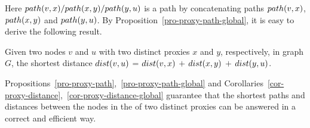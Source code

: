 Here $\path(v, x)/\path(x, y)/\path(y, u)$ is a path by concatenating paths $\path(v,x)$, $\path(x,y)$ and $\path(y,u)$.
By Proposition~\ref{pro-proxy-path-global}, it is easy to derive the following result.

\begin{cor}
\label{cor-proxy-distance-global} Given two nodes $v$ and $u$ with two distinct proxies $x$ and $y$, respectively, in graph $G$, the shortest distance $\dist(v, u)$ = $\dist(v, x)$ $+$ $\dist(x, y)$  $+$ $\dist(y, u)$.
\end{cor}


Propositions~\ref{pro-proxy-path},~\ref{pro-proxy-path-global} and Corollaries~\ref{cor-proxy-distance},~\ref{cor-proxy-distance-global} guarantee that the shortest paths and distances between the nodes in the \dras of two distinct proxies can be answered in a correct and efficient way.






